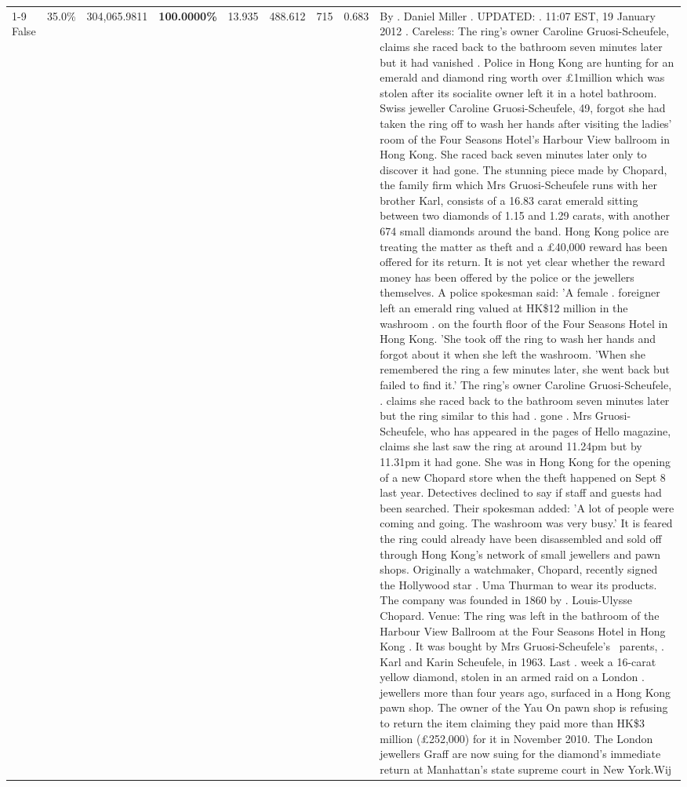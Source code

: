 \begin{table}[H]
\begin{tabular}{lllrlllll}
\cline{1-9}
False & 35.0\% & 304,065.9811 & \bfseries \color{red} 100.0000\% & 13.935 & 488.612 & 715 & 0.683 & By . Daniel Miller . UPDATED: . 11:07 EST, 19 January 2012 . Careless: The ring's owner Caroline Gruosi-Scheufele, claims she raced back to the bathroom seven minutes later but it had vanished . Police in Hong Kong are hunting for an emerald and diamond ring worth over £1million which was stolen after its socialite owner left it in a hotel bathroom. Swiss jeweller Caroline Gruosi-Scheufele, 49, forgot she had taken the ring off to wash her hands after visiting the ladies' room of the Four Seasons Hotel's Harbour View ballroom in Hong Kong. She raced back seven minutes later only to discover it had gone. The stunning piece made by Chopard, the family firm which Mrs Gruosi-Scheufele runs with her brother Karl, consists of a 16.83 carat emerald sitting between two diamonds of 1.15 and 1.29 carats, with another 674 small diamonds around the band. Hong Kong police are treating the matter as theft and a £40,000 reward has been offered for its return. It is not yet clear whether the reward money has been offered by the police or the jewellers themselves. A police spokesman said: 'A female . foreigner left an emerald ring valued at HK\$12 million in the washroom . on the fourth floor of the Four Seasons Hotel in Hong Kong. 'She took off the ring to wash her hands and forgot about it when she left the washroom. 'When she remembered the ring a few minutes later, she went back but failed to find it.' The ring's owner Caroline Gruosi-Scheufele, . claims she raced back to the bathroom seven minutes later but the ring similar to this had . gone . Mrs Gruosi-Scheufele, who has appeared in the pages of Hello magazine, claims she last saw the ring at around 11.24pm but by 11.31pm it had gone. She was in Hong Kong for the opening of a new Chopard store when the theft happened on Sept 8 last year. Detectives declined to say if staff and guests had been searched. Their spokesman added: 'A lot of people were coming and going. The washroom was very busy.' It is feared the ring could already have been disassembled and sold off through Hong Kong's network of small jewellers and pawn shops. Originally a watchmaker, Chopard, recently signed the Hollywood star . Uma Thurman to wear its products. The company was founded in 1860 by . Louis-Ulysse Chopard. Venue: The ring was left in the bathroom of the Harbour View Ballroom at the Four Seasons Hotel in Hong Kong . It was bought by Mrs Gruosi-Scheufele's  parents, . Karl and Karin Scheufele, in 1963. Last . week a 16-carat yellow diamond, stolen in an armed raid on a London . jewellers more than four years ago, surfaced in a Hong Kong pawn shop. The owner of the Yau On pawn shop is refusing to return the item claiming they paid more than HK\$3 million (£252,000) for it in November 2010. The London jewellers Graff are now suing for the diamond’s immediate return at Manhattan’s state supreme court in New York.Wij \\

\end{tabular}
\end{table}

